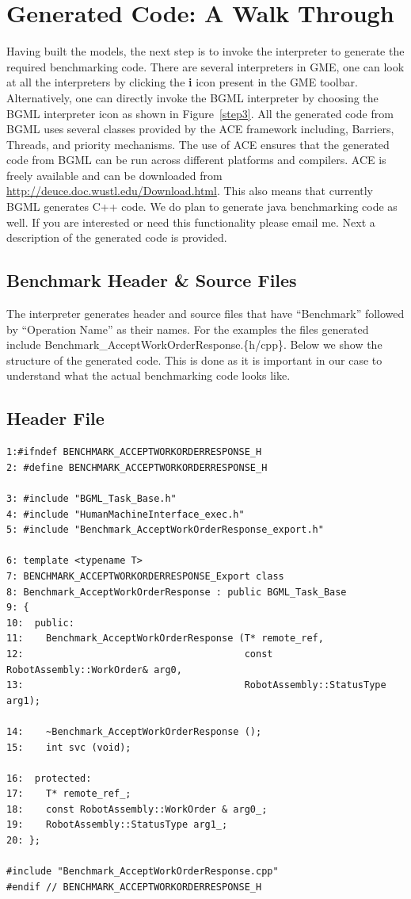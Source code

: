 \documentclass[onecolumn]{article}
\begin{document}
\section* {Generated Code: A Walk Through}
Having built the models, the next step is to invoke the interpreter to
generate the required benchmarking code. There are several
interpreters in GME, one can look at all the interpreters by clicking
the {\bf i} icon present in the GME toolbar. Alternatively, one can
directly invoke the BGML interpreter by choosing the BGML interpreter
icon as shown in Figure~\ref{step3}. All the generated code from BGML
uses several classes provided by the ACE framework including,
Barriers, Threads, and priority mechanisms. The use of ACE ensures
that the generated code from BGML can be run across different
platforms and compilers. ACE is freely available and can be downloaded
from \url{http://deuce.doc.wustl.edu/Download.html}. This also means
that currently BGML generates C++ code. We do plan to generate java
benchmarking code as well. If you are interested or need this
functionality please email me. Next 
a description of the generated code is provided.

\subsection* {Benchmark Header \& Source Files}
The interpreter generates header and source files that have
``Benchmark'' followed by ``Operation Name'' as their names. For the
examples the files generated include
Benchmark\_AcceptWorkOrder\-Response.\{h/cpp\}. Below we show the structure
of the generated code. This is done as it is important in our case to
understand what the actual benchmarking code looks like.

\subsection* {Header File}
{
\footnotesize
\begin{verbatim}
1:#ifndef BENCHMARK_ACCEPTWORKORDERRESPONSE_H
2: #define BENCHMARK_ACCEPTWORKORDERRESPONSE_H

3: #include "BGML_Task_Base.h"
4: #include "HumanMachineInterface_exec.h"
5: #include "Benchmark_AcceptWorkOrderResponse_export.h"

6: template <typename T>
7: BENCHMARK_ACCEPTWORKORDERRESPONSE_Export class
8: Benchmark_AcceptWorkOrderResponse : public BGML_Task_Base
9: {
10:  public:
11:    Benchmark_AcceptWorkOrderResponse (T* remote_ref,
12:                                       const RobotAssembly::WorkOrder& arg0,
13:                                       RobotAssembly::StatusType arg1);

14:    ~Benchmark_AcceptWorkOrderResponse ();
15:    int svc (void);

16:  protected:
17:    T* remote_ref_;
18:    const RobotAssembly::WorkOrder & arg0_;
19:    RobotAssembly::StatusType arg1_;
20: };

#include "Benchmark_AcceptWorkOrderResponse.cpp"
#endif // BENCHMARK_ACCEPTWORKORDERRESPONSE_H
\end{verbatim}
}
\normalsize
\end{document}
